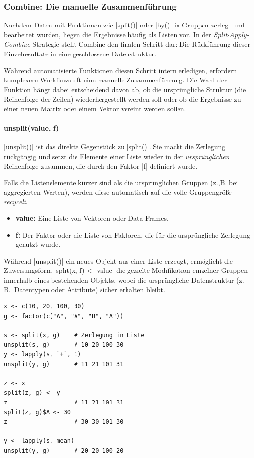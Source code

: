 \documentclass[10pt,twocolumn]{scrartcl}
\renewcommand{\lstinline}{\mycoloredinline}
\begin{document}
\subsubsection{Combine: Die manuelle Zusammenführung}

Nachdem Daten mit Funktionen wie \lstinline|split()| oder \lstinline|by()| in Gruppen zerlegt und bearbeitet wurden, liegen die Ergebnisse häufig als Listen vor. In der \emph{Split-Apply-Combine}-Strategie stellt Combine den finalen Schritt dar: Die Rückführung dieser Einzelresultate in eine geschlossene Datenstruktur.

Während automatisierte Funktionen diesen Schritt intern erledigen, erfordern komplexere Workflows oft eine manuelle Zusammenführung. Die Wahl der Funktion hängt dabei entscheidend davon ab, ob die ursprüngliche Struktur (die Reihenfolge der Zeilen) wiederhergestellt werden soll oder ob die Ergebnisse zu einer neuen Matrix oder einem Vektor vereint werden sollen.


\paragraph{unsplit(value, f)}

\lstinline|unsplit()| ist das direkte Gegenstück zu \lstinline|split()|. Sie macht die Zerlegung rückgängig und setzt die Elemente einer Liste wieder in der \emph{ursprünglichen} Reihenfolge zusammen, die durch den Faktor \lstinline|f| definiert wurde.

Falls die Listenelemente kürzer sind als die ursprünglichen Gruppen (z.,B. bei aggregierten Werten), werden diese automatisch auf die volle Gruppengröße \emph{recycelt}.

\begin{itemize}
\item \textbf{value:} Eine Liste von Vektoren oder Data Frames.
\item \textbf{f:} Der Faktor oder die Liste von Faktoren, die für die ursprüngliche Zerlegung genutzt wurde.
\end{itemize} 

Während \lstinline|unsplit()| ein neues Objekt aus einer Liste erzeugt, ermöglicht die Zuweisungsform \lstinline|split(x, f) <- value| die gezielte Modifikation einzelner Gruppen innerhalb eines bestehenden Objekts, wobei die ursprüngliche Datenstruktur (z.\,B.\ Datentypen oder Attribute) sicher erhalten bleibt.

\begin{lstlisting}
x <- c(10, 20, 100, 30)
g <- factor(c("A", "A", "B", "A"))

s <- split(x, g)    # Zerlegung in Liste
unsplit(s, g)       # 10 20 100 30
y <- lapply(s, `+`, 1)
unsplit(y, g)       # 11 21 101 31

z <- x
split(z, g) <- y
z                   # 11 21 101 31
split(z, g)$A <- 30
z                   # 30 30 101 30

y <- lapply(s, mean)
unsplit(y, g)       # 20 20 100 20
\end{lstlisting}
\end{document}
